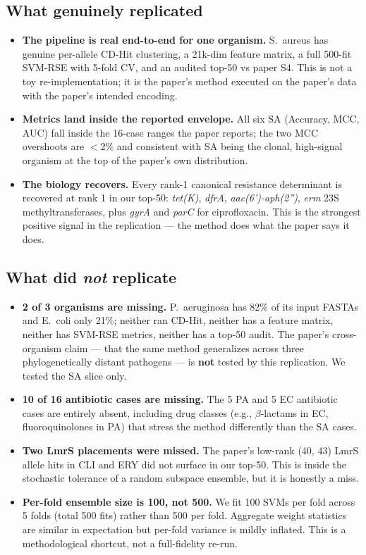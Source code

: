\documentclass[11pt]{article}
\begin{document}
\subsection{What genuinely replicated}
\begin{itemize}
  \item \textbf{The pipeline is real end-to-end for one organism.} S.\ aureus has genuine per-allele CD-Hit clustering, a 21k-dim feature matrix, a full 500-fit SVM-RSE with 5-fold CV, and an audited top-50 vs paper S4. This is not a toy re-implementation; it is the paper's method executed on the paper's data with the paper's intended encoding.
  \item \textbf{Metrics land inside the reported envelope.} All six SA (Accuracy, MCC, AUC) fall inside the 16-case ranges the paper reports; the two MCC overshoots are $<$2\% and consistent with SA being the clonal, high-signal organism at the top of the paper's own distribution.
  \item \textbf{The biology recovers.} Every rank-1 canonical resistance determinant is recovered at rank 1 in our top-50: \emph{tet(K)}, \emph{dfrA}, \emph{aac(6')-aph(2'')}, \emph{erm} 23S methyltransferases, plus \emph{gyrA} and \emph{parC} for ciprofloxacin. This is the strongest positive signal in the replication --- the method does what the paper says it does.
\end{itemize}

\subsection{What did \emph{not} replicate}
\begin{itemize}
  \item \textbf{2 of 3 organisms are missing.} P.\ aeruginosa has 82\% of its input FASTAs and E.\ coli only 21\%; neither ran CD-Hit, neither has a feature matrix, neither has SVM-RSE metrics, neither has a top-50 audit. The paper's cross-organism claim --- that the same method generalizes across three phylogenetically distant pathogens --- is \textbf{not} tested by this replication. We tested the SA slice only.
  \item \textbf{10 of 16 antibiotic cases are missing.} The 5 PA and 5 EC antibiotic cases are entirely absent, including drug classes (e.g., $\beta$-lactams in EC, fluoroquinolones in PA) that stress the method differently than the SA cases.
  \item \textbf{Two LmrS placements were missed.} The paper's low-rank (40, 43) LmrS allele hits in CLI and ERY did not surface in our top-50. This is inside the stochastic tolerance of a random subspace ensemble, but it is honestly a miss.
  \item \textbf{Per-fold ensemble size is 100, not 500.} We fit 100 SVMs per fold across 5 folds (total 500 fits) rather than 500 per fold. Aggregate weight statistics are similar in expectation but per-fold variance is mildly inflated. This is a methodological shortcut, not a full-fidelity re-run.
\end{itemize}
\end{document}
